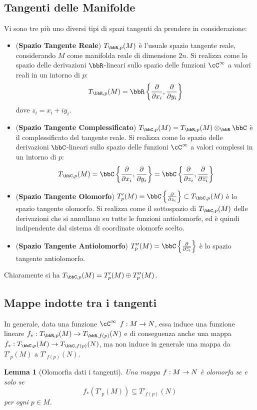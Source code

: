 \documentclass[a4paper,11pt]{article}
\newtheorem{lemma}{Lemma}
\begin{document}
\subsection{Tangenti delle Manifolde}
Vi sono tre più uno diversi tipi di spazi tangenti da prendere in considerazione:
\begin{itemize}
\item ({\bf Spazio Tangente Reale}) $T_{\bbR, p}(M)$ è l'usuale spazio tangente reale, considerando $M$ come manifolda reale di dimensione $2n$.
  Si realizza come lo spazio delle derivazioni $\bbR$-lineari sullo spazio delle funzioni $\cC^\infty$ a valori reali in un intorno di $p$:
  $$ T_{\bbR, p}(M) = \bbR \left\{ \dpar{}{x_i}, \dpar{}{y_i} \right\} $$
  dove $z_i = x_i + i y_i$.
\item ({\bf Spazio Tangente Complessificato}) $T_{\bbC, p}(M) = T_{\bbR, p}(M) \otimes_\bbR \bbC$ è il complessificato del tangente reale.
  Si realizza come lo spazio delle derivazioni $\bbC$-lineari sullo spazio delle funzioni $\cC^\infty$ a valori complessi in un intorno di $p$:
  $$ T_{\bbC, p}(M) = \bbC \left\{ \dpar{}{x_i}, \dpar{}{y_i} \right\} = \bbC \left\{ \dpar{}{z_i}, \dpar{}{\overline{z_i}} \right\} $$
\item ({\bf Spazio Tangente Olomorfo}) $T'_p(M) = \bbC \left\{ \dpar{}{z_i} \right\} \subset T_{\bbC, p}(M)$ è lo spazio tangente olomorfo.
  Si realizza come il sottospazio di $T_{\bbC, p}(M)$ delle derivazioni che si annullano su tutte le funzioni antiolomorfe, ed è quindi indipendente dal sistema di coordinate olomorfe scelto.
\item ({\bf Spazio Tangente Antiolomorfo}) $T''_p(M) = \bbC \left\{ \dpar{}{\overline{z_i}} \right\}$ è lo spazio tangente antiolomorfo.
\end{itemize}

Chiaramente si ha $T_{\bbC, p}(M) = T'_p(M) \oplus T''_p(M)$.

\subsection{Mappe indotte tra i tangenti}
In generale, data una funzione $\cC^\infty$ $f: M \rightarrow N$, essa induce una funzione lineare $f_*: T_{\bbR, p}(M) \rar T_{\bbR, f(p)}(N)$ e di conseguenza anche una mappa $f_*: T_{\bbC, p}(M) \rar T_{\bbC, f(p)}(N)$, ma non induce in generale una mappa da $T'_p(M)$ a $T'_{f(p)}(N)$.

\begin{lemma}[Olomorfia dati i tangenti]
  Una mappa $f: M \rightarrow N$ è olomorfa se e solo se
  $$ f_*(T'_p(M)) \subseteq T'_{f(p)}(N) $$
  per ogni $p \in M$.
\end{lemma}
\end{document}
